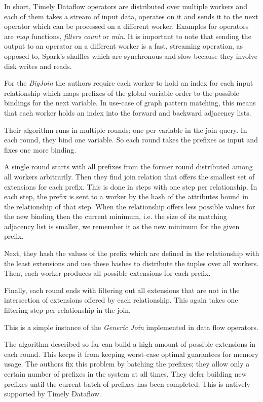 In short, Timely Dataflow operators are distributed over multiple workers and each of them takes a stream of input data, operates
on it and sends it to the next operator which can be processed on a different worker.
Examples for operators are \textit{map} functions, \textit{filters} \textit{count} or \textit{min}.
It is important to note that sending the output to an operator on a different worker is a fast, streaming operation, as opposed to,
Spark's shuffles which are synchronous and slow because they involve disk writes and reads.

For the \textit{BigJoin} the authors require each worker to hold an index for each input relationship which maps prefixes
of the global variable order to the possible bindings for the next variable.
In use-case of graph pattern matching, this means that each worker holds an index into the forward and backward adjacency lists.

Their algorithm runs in multiple rounds;
one per variable in the join query.
In each round, they bind one variable.
So each round takes the prefixes as input and fixes one more binding.

A single round starts with all prefixes from the former round distributed among all workers arbitrarily.
Then they find join relation that offers the smallest set of extensions for each prefix.
This is done in steps with one step per relationship.
In each step, the prefix is sent to a worker by the hash of the attributes bound in the relationship of that step.
When the relationship offers less possible values for the new binding then the current minimum, i.e. the size of its matching adjacency
list is smaller, we remember it as the new minimum for the given prefix.

Next, they hash the values of the prefix which are defined in the relationship with the least extensions and use these hashes to
distribute the tuples over all workers.
Then, each worker produces all possible extensions for each prefix.

Finally, each round ends with filtering out all extensions that are not in the intersection of extensions offered by each relationship.
This again takes one filtering step per relationship in the join.

This is a simple instance of the \textit{Generic Join} implemented in data flow operators.

The algorithm described so far can build a high amount of possible extensions in each round.
This keeps it from keeping worst-case optimal guarantees for memory usage.
The authors fix this problem by batching the prefixes;
they allow only a certain number of prefixes in the system at all times.
They defer building new prefixes until the current batch of prefixes has been completed.
This is natively supported by Timely Dataflow.

